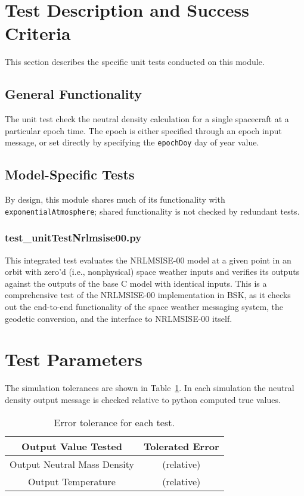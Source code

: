 
\section{Test Description and Success Criteria}
This section describes the specific unit tests conducted on this module.

\subsection{General Functionality}
The unit test check the neutral density calculation for a single spacecraft at a particular epoch time.  The epoch is either specified through an epoch input message, or set directly by specifying the {\tt epochDoy} day of year value.  

\subsection{Model-Specific Tests}

By design, this module shares much of its functionality with \verb|exponentialAtmosphere|; shared functionality is not checked by redundant tests.

\subsubsection{test\_unitTestNrlmsise00.py}
This integrated test evaluates the NRLMSISE-00 model at a given point in an orbit with zero'd (i.e., nonphysical) space weather inputs and verifies its outputs against the outputs of the base C model with identical inputs. This is a comprehensive test of the NRLMSISE-00 implementation in BSK, as it checks out the end-to-end functionality of the space weather messaging system, the geodetic conversion, and the interface to NRLMSISE-00 itself.

\section{Test Parameters}
The simulation tolerances are shown in Table~\ref{tab:errortol}.  In each simulation the neutral density output message is checked relative to python computed true values.  
\begin{table}[htbp]
	\caption{Error tolerance for each test.}
	\label{tab:errortol}
	\centering \fontsize{10}{10}\selectfont
	\begin{tabular}{ c | c } %
		\hline\hline
		\textbf{Output Value Tested}  & \textbf{Tolerated Error}  \\ 
		\hline
		{Output Neutral Mass Density}        & { (relative) }  \\
		{Output Temperature}        &  (relative)  \\ 
		\hline\hline
	\end{tabular}
\end{table}




